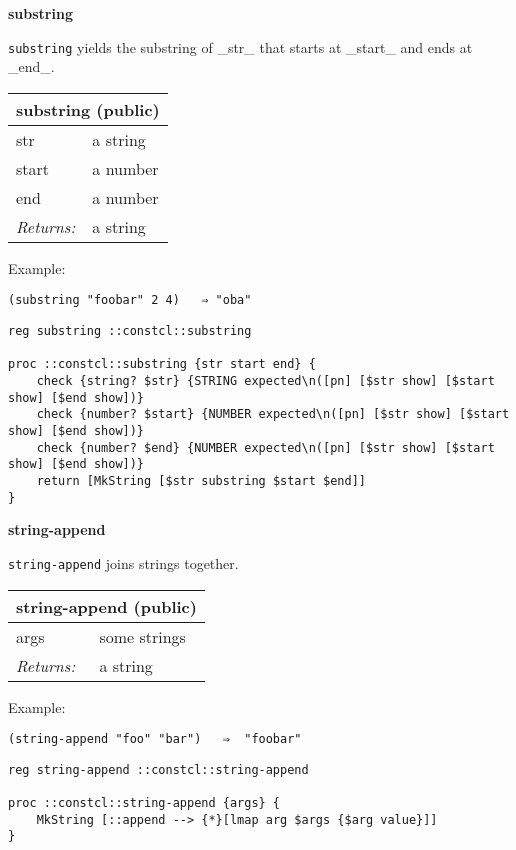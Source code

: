 \documentclass{report}
\begin{document}
\textbf{substring}


\texttt{substring} yields the substring of \_str\_ that starts at \_start\_ and ends at \_end\_.

\begin{tabular}{ |l l| }
\hline
\multicolumn{2}{|l|}{substring (public)} \\
\hline
str & a string \\
start & a number \\
end & a number \\
\textit{Returns:} & a string \\
\hline
\end{tabular}


Example:

\noindent\makebox[\linewidth]{\rule{\linewidth}{0.4pt}}
\begin{lstlisting}
(substring "foobar" 2 4)   ⇒ "oba"
\end{lstlisting}
\noindent\makebox[\linewidth]{\rule{\linewidth}{0.4pt}}
\noindent\makebox[\linewidth]{\rule{\linewidth}{0.4pt}}
\begin{lstlisting}
reg substring ::constcl::substring
 
proc ::constcl::substring {str start end} {
    check {string? $str} {STRING expected\n([pn] [$str show] [$start show] [$end show])}
    check {number? $start} {NUMBER expected\n([pn] [$str show] [$start show] [$end show])}
    check {number? $end} {NUMBER expected\n([pn] [$str show] [$start show] [$end show])}
    return [MkString [$str substring $start $end]]
}
\end{lstlisting}
\noindent\makebox[\linewidth]{\rule{\linewidth}{0.4pt}}

\textbf{string-append}


\texttt{string-append} joins strings together.

\begin{tabular}{ |l l| }
\hline
\multicolumn{2}{|l|}{string-append (public)} \\
\hline
args & some strings \\
\textit{Returns:} & a string \\
\hline
\end{tabular}


Example:

\noindent\makebox[\linewidth]{\rule{\linewidth}{0.4pt}}
\begin{lstlisting}
(string-append "foo" "bar")   ⇒  "foobar"
\end{lstlisting}
\noindent\makebox[\linewidth]{\rule{\linewidth}{0.4pt}}
\noindent\makebox[\linewidth]{\rule{\linewidth}{0.4pt}}
\begin{lstlisting}
reg string-append ::constcl::string-append
 
proc ::constcl::string-append {args} {
    MkString [::append --> {*}[lmap arg $args {$arg value}]]
}
\end{lstlisting}
\noindent\makebox[\linewidth]{\rule{\linewidth}{0.4pt}}
\end{document}
